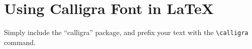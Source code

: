 \documentclass[a4paper,11pt]{article}
\begin{document}
\section{Using Calligra Font in \LaTeX}

\normalfont\calligra
Simply include the ``calligra'' package, and prefix your text with the
\verb|\calligra| command.
\end{document}
